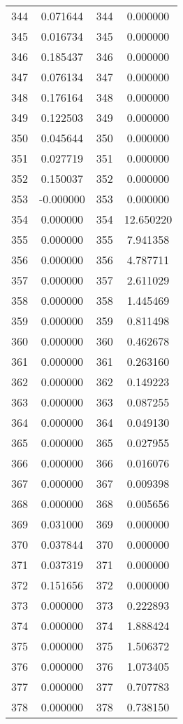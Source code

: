 \documentclass[12pt]{article}
\begin{document}
\begin{longtable}{@{}cccc@{}}
344 & 0.071644 & 344 & 0.000000 \\
345 & 0.016734 & 345 & 0.000000 \\
346 & 0.185437 & 346 & 0.000000 \\
347 & 0.076134 & 347 & 0.000000 \\
348 & 0.176164 & 348 & 0.000000 \\
349 & 0.122503 & 349 & 0.000000 \\
350 & 0.045644 & 350 & 0.000000 \\
351 & 0.027719 & 351 & 0.000000 \\
352 & 0.150037 & 352 & 0.000000 \\
353 & -0.000000 & 353 & 0.000000 \\
354 & 0.000000 & 354 & 12.650220 \\
355 & 0.000000 & 355 & 7.941358 \\
356 & 0.000000 & 356 & 4.787711 \\
357 & 0.000000 & 357 & 2.611029 \\
358 & 0.000000 & 358 & 1.445469 \\
359 & 0.000000 & 359 & 0.811498 \\
360 & 0.000000 & 360 & 0.462678 \\
361 & 0.000000 & 361 & 0.263160 \\
362 & 0.000000 & 362 & 0.149223 \\
363 & 0.000000 & 363 & 0.087255 \\
364 & 0.000000 & 364 & 0.049130 \\
365 & 0.000000 & 365 & 0.027955 \\
366 & 0.000000 & 366 & 0.016076 \\
367 & 0.000000 & 367 & 0.009398 \\
368 & 0.000000 & 368 & 0.005656 \\
369 & 0.031000 & 369 & 0.000000 \\
370 & 0.037844 & 370 & 0.000000 \\
371 & 0.037319 & 371 & 0.000000 \\
372 & 0.151656 & 372 & 0.000000 \\
373 & 0.000000 & 373 & 0.222893 \\
374 & 0.000000 & 374 & 1.888424 \\
375 & 0.000000 & 375 & 1.506372 \\
376 & 0.000000 & 376 & 1.073405 \\
377 & 0.000000 & 377 & 0.707783 \\
378 & 0.000000 & 378 & 0.738150 \\

\end{longtable}
\end{document}

